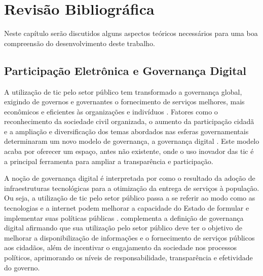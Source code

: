 \chapter[Revisão Bibliográfica]{Revisão Bibliográfica} 
\label{cap:cap2}

Neste capítulo serão discutidos alguns aspectos teóricos necessários para uma boa compreensão do desenvolvimento deste trabalho.

\section{Participação Eletrônica e Governança Digital}
\label{sec:e-part}
\par
A utilização de \acrfull{tic} pelo setor público tem transformado a governança global, exigindo de governos e governantes o fornecimento de serviços melhores, 
mais econômicos e eficientes às organizações e indivíduos \cite{afdb2014uneca}. Fatores como o reconhecimento da sociedade civil organizada, o aumento da participação cidadã e a 
ampliação e diversificação dos temas abordados nas esferas governamentais determinaram um novo modelo de governança, a governança digital \cite{o2011government}. 
Este modelo acaba por oferecer um espaço, antes não existente, onde o uso inovador das \acrshort{tic} é a principal ferramenta para ampliar a transparência e participação.

\par
A noção de governança digital é interpretada por  como o resultado da adoção de infraestruturas tecnológicas para a otimização da entrega de 
serviços à população. Ou seja, a utilização de \acrshort{tic} pelo setor público passa a se referir ao modo como as tecnologias e a internet podem melhorar a capacidade do Estado 
de formular e implementar suas políticas públicas \cite{parra2017governancca}.  complementa a definição de governança digital afirmando que sua 
utilização pelo setor público deve ter o objetivo de melhorar a disponibilização de informações e o fornecimento de serviços públicos aos cidadãos, 
além de incentivar o engajamento da sociedade nos processos políticos, aprimorando os níveis de responsabilidade, transparência e efetividade do governo.

